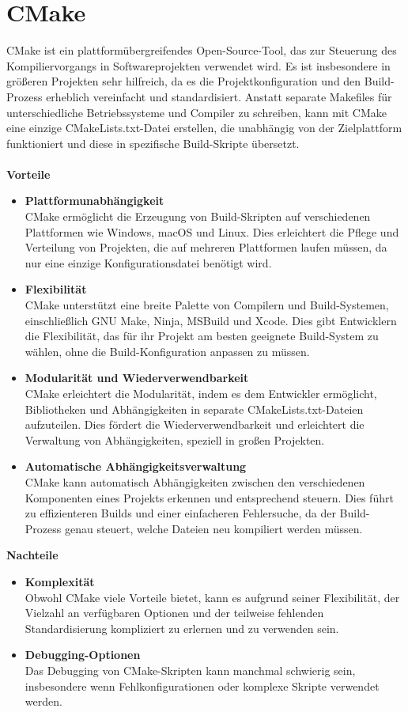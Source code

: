 \section{CMake}
\label{sec:tooling-cmake}
CMake ist ein plattformübergreifendes Open-Source-Tool, das zur Steuerung des Kompiliervorgangs in Softwareprojekten verwendet wird.
Es ist insbesondere in größeren Projekten sehr hilfreich, da es die Projektkonfiguration und den Build-Prozess erheblich vereinfacht und standardisiert.
Anstatt separate Makefiles für unterschiedliche Betriebssysteme und Compiler zu schreiben, kann mit CMake eine einzige CMakeLists.txt-Datei erstellen, die unabhängig von der Zielplattform funktioniert und diese in spezifische Build-Skripte übersetzt. \cite{Cmake2024}\\\\
\textbf{Vorteile}
\begin{itemize}
    \item \textbf{Plattformunabhängigkeit}\\
    CMake ermöglicht die Erzeugung von Build-Skripten auf verschiedenen Plattformen wie Windows, macOS und Linux.
    Dies erleichtert die Pflege und Verteilung von Projekten, die auf mehreren Plattformen laufen müssen, da nur eine einzige Konfigurationsdatei benötigt wird.
    \item \textbf{Flexibilität}\\
    CMake unterstützt eine breite Palette von Compilern und Build-Systemen, einschließlich GNU Make, Ninja, MSBuild und Xcode.
    Dies gibt Entwicklern die Flexibilität, das für ihr Projekt am besten geeignete Build-System zu wählen, ohne die Build-Konfiguration anpassen zu müssen.
    \item \textbf{Modularität und Wiederverwendbarkeit}\\
    CMake erleichtert die Modularität, indem es dem Entwickler ermöglicht, Bibliotheken und Abhängigkeiten in separate CMakeLists.txt-Dateien aufzuteilen.
    Dies fördert die Wiederverwendbarkeit und erleichtert die Verwaltung von Abhängigkeiten, speziell in großen Projekten.
    \item \textbf{Automatische Abhängigkeitsverwaltung}\\
    CMake kann automatisch Abhängigkeiten zwischen den verschiedenen Komponenten eines Projekts erkennen und entsprechend steuern.
    Dies führt zu effizienteren Builds und einer einfacheren Fehlersuche, da der Build-Prozess genau steuert, welche Dateien neu kompiliert werden müssen.
\end{itemize}
\textbf{Nachteile}
\begin{itemize}
    \item \textbf{Komplexität}\\
    Obwohl CMake viele Vorteile bietet, kann es aufgrund seiner Flexibilität, der Vielzahl an verfügbaren Optionen und der teilweise fehlenden Standardisierung kompliziert zu erlernen und zu verwenden sein.
    \item \textbf{Debugging-Optionen}\\
    Das Debugging von CMake-Skripten kann manchmal schwierig sein, insbesondere wenn Fehlkonfigurationen oder komplexe Skripte verwendet werden.
\end{itemize}

